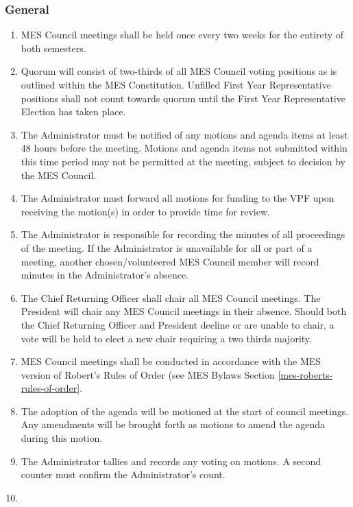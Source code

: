 \hypertarget{meetings-general}{%
 \subsubsection{General}
 \label{meetings-general}}

\begin{enumerate}
 \item
  MES Council meetings shall be held once every two weeks for the
  entirety of both semesters.
 \item
  Quorum will consist of two-thirds of all MES Council voting positions
  as is outlined within the MES Constitution. Unfilled First Year
  Representative positions shall not count towards quorum until the
  First Year Representative Election has taken place.
 \item
  The Administrator must be notified of any motions and agenda items at
  least 48 hours before the meeting. Motions and agenda items not
  submitted within this time period may not be permitted at the meeting,
  subject to decision by the MES Council.
 \item
  The Administrator must forward all motions for funding to the VPF upon
  receiving the motion(s) in order to provide time for review.
 \item
  The Administrator is responsible for recording the minutes of all
  proceedings of the meeting. If the Administrator is unavailable for
  all or part of a meeting, another chosen/volunteered MES Council
  member will record minutes in the Administrator's absence.
 \item \label{CRO-chair-meetings}
  The Chief Returning Officer shall chair all MES Council meetings. The
  President will chair any MES Council meetings in their absence. Should
  both the Chief Returning Officer and President decline or are unable
  to chair, a vote will be held to elect a new chair requiring a two
  thirds majority.
 \item
  MES Council meetings shall be conducted in accordance with the MES
  version of Robert's Rules of Order (see MES Bylaws Section \ref{mes-roberts-rules-of-order}.
 \item
  The adoption of the agenda will be motioned at the start of council
  meetings. Any amendments will be brought forth as motions to amend the
  agenda during this motion.
 \item
  The Administrator tallies and records any voting on motions. A second
  counter must confirm the Administrator's count.
 \item

\end{enumerate}
